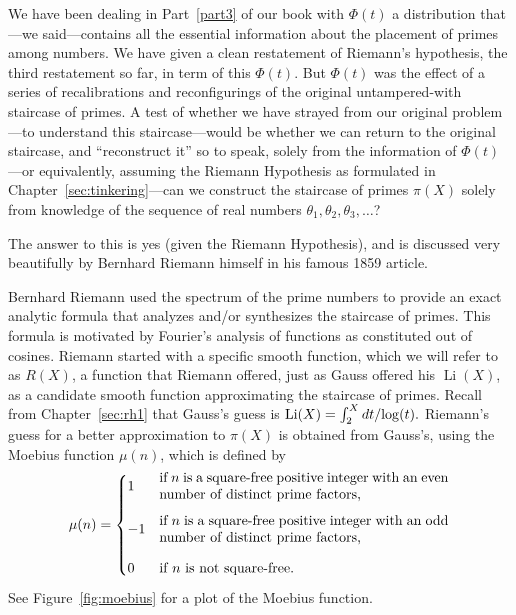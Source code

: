 \documentclass[openany]{book}
\DeclareMathOperator{\Li}{Li}
\theoremstyle{plain}
\theoremstyle{definition}
\newcommand{\RH}{Riemann Hypothesis\index{Riemann Hypothesis}}
\begin{document}
{{  We have been dealing in Part~\ref{part3} of our book with $\Phi(t)$ a
  distribution that---we said---contains all the essential information
  about the placement of primes among numbers. We have given a clean
  restatement of Riemann's hypothesis, the third restatement so far,
  in term of this $\Phi(t)$.  But $\Phi(t)$ was the effect of a series
  of recalibrations and reconfigurings of the original untampered-with
  staircase of primes.  A test of whether we have strayed from our
  original problem---to understand this staircase---would be whether
  we can return to the original staircase, and ``reconstruct it'' so to
  speak, solely from the information of $\Phi(t)$---or equivalently,
  assuming the \RH{} as formulated in Chapter~\ref{sec:tinkering}---can
  we construct the staircase of primes $\pi(X)$ solely
  from knowledge of the sequence of real numbers $\theta_1,
  \theta_2,\theta_3,\dots$?




  The answer to this is yes (given the \RH{}), and is discussed very
  beautifully by Bernhard Riemann himself in his famous 1859 article.

  Bernhard Riemann used the spectrum of the prime numbers to provide
  an exact analytic formula that analyzes and/or synthesizes the
  staircase of primes.  This formula is motivated by Fourier's
  analysis of functions as constituted out of cosines.  Riemann started
  with a specific smooth function, which we will refer to as $R(X)$, a
  function that Riemann offered, just as Gauss offered his $\Li(X)$,
  as a candidate smooth function approximating the staircase of
  primes.  Recall from Chapter~\ref{sec:rh1} that Gauss's guess is
  $\Li(X)= \int_2^{X}dt/{\rm log}(t).$ Riemann's guess for a better
  approximation to $\pi(X)$ is obtained from Gauss's, using the Moebius
  function $\mu(n)$, which is defined by
$$
 \mu(n) = \begin{cases}
    1 &
       \mbox{\begin{minipage}{0.6\textwidth}if $n$ is a square-free
       positive integer with an even number of distinct prime
       factors,\end{minipage}}\vspace{1em}\\
    -1& \mbox{\begin{minipage}{0.6\textwidth}if $n$ is a square-free
    positive integer with an odd number of distinct
    prime factors,\end{minipage}}\vspace{1em}\\
    0 & \mbox{if $n$ is not square-free.}
 \end{cases}
 $$
 See Figure~\ref{fig:moebius} for a plot of the Moebius function.

}}
\end{document}

